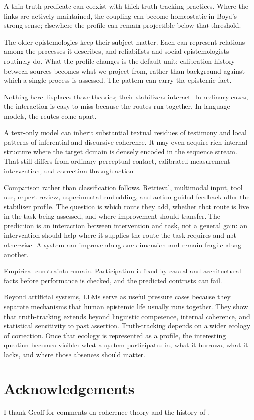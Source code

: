 \documentclass[12pt]{article}
\begin{document}
A thin truth predicate can coexist with thick truth-tracking practices. Where the links
are actively maintained, the coupling can become homeostatic in Boyd's strong sense;
elsewhere the profile can remain projectible below that threshold.

The older epistemologies keep their subject matter. Each can represent relations among
the processes it describes, and reliabilists and social epistemologists routinely do. What
the profile changes is the default unit: calibration history between sources becomes what
we project from, rather than background against which a single process is assessed. The
pattern can carry the epistemic fact.

Nothing here displaces those theories; their stabilizers interact. In ordinary cases,
the interaction is easy to miss because the routes run
together. In language models, the routes come apart.

A text-only model can inherit substantial textual residues of testimony and local patterns
of inferential and discursive coherence. It may even acquire rich internal structure where
the target domain is densely encoded in the sequence stream. That still differs from
ordinary perceptual contact, calibrated measurement, intervention, and correction through
action.

Comparison rather than classification follows. Retrieval, multimodal input, tool use,
expert review, experimental embedding, and action-guided feedback alter the stabilizer
profile. The question is which route they add, whether that route is live in the task
being assessed, and where improvement should transfer. The prediction is an interaction
between intervention and task, not a general gain: an intervention should help where it
supplies the route the task requires and not otherwise. A system can improve along one
dimension and remain fragile along another.

Empirical constraints remain. Participation is fixed by causal and architectural facts
before performance is checked, and the predicted contrasts can fail.

Beyond artificial systems, LLMs serve as useful pressure cases because they separate
mechanisms that human epistemic life usually runs together. They
show that truth-tracking extends beyond linguistic competence, internal coherence, and
statistical sensitivity to past assertion. Truth-tracking depends on a wider ecology of
correction. Once that ecology is represented as a profile, the interesting question
becomes visible: what a system participates in, what it borrows, what it lacks, and where
those absences should matter.

\section*{Acknowledgements}
I thank Geoff for comments on coherence theory and the history of .

\clearpage
\printbibliography
\end{document}
